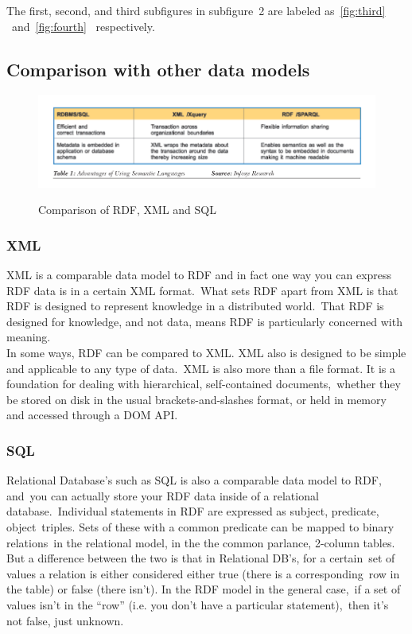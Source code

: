   \noindent The first, second, and third subfigures in subfigure\
  2 are labeled as\
  \ref{fig:third} \citep{parachuri2008role}\
  and~\ref{fig:fourth}~\citep{_Borden_2013} respectively.\\


 \subsection{Comparison with other data models}

  \begin{figure}[ht!]
    \centering
    \includegraphics[scale=0.5]{sqlrdf.png}
    \caption{Comparison of RDF, XML and SQL}
    \citep[Fig.~1]{parachuri2008role}
    \label{fig:nwhin}
  \end{figure}  

  \subsubsection{XML}
  XML is a comparable data model to RDF and in fact one way you can express RDF data is in a certain XML format.\
  What sets RDF apart from XML is that RDF is designed to represent knowledge in a distributed world.\
  That RDF is designed for knowledge, and not data, means RDF is particularly concerned with meaning.\\

  \noindent In some ways, RDF can be compared to XML. XML also is designed to be simple and applicable to any type of data.\
  XML is also more than a file format. It is a foundation for dealing with hierarchical, self-contained documents,\
  whether they be stored on disk in the usual brackets-and-slashes format, or held in memory and accessed through a DOM API.\
  \citep{_rdf_about_2013}\\

  \subsubsection{SQL}
  Relational Database’s such as SQL is also a comparable data model to RDF, and\
  you can actually store your RDF data inside of a relational database.\
  Individual statements in RDF are expressed as subject, predicate, object\ 
  triples. Sets of these with a common predicate can be mapped to binary relations\
  in the relational model, in the the common parlance, 2-column tables.\\

  \noindent But a difference between the two is that in Relational DB's, for a certain\
  set of values a relation is either considered either true (there is a corresponding\
  row in the table) or false (there isn't). In the RDF model in the general case,\
  if a set of values isn't in the ``row'' (i.e. you don't have a particular statement),\
  then it's not false, just unknown. \citep{_rdf_comparison_2013}\
